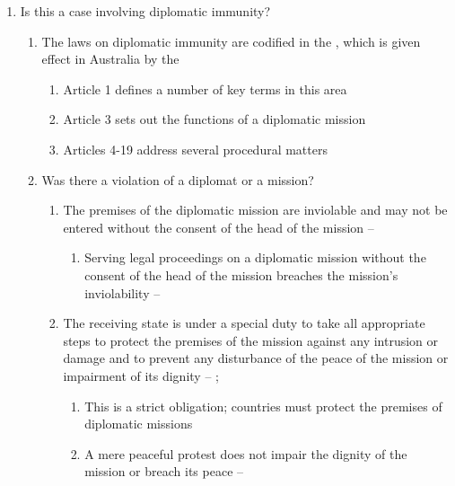 \begin{enumerate}
    \item Is this a case involving diplomatic immunity?
    \begin{enumerate}
        \item The laws on diplomatic immunity are codified in the , which is given effect in Australia by the 
        \begin{enumerate}
            \item Article 1 defines a number of key terms in this area
            \item Article 3 sets out the functions of a diplomatic mission
            \item Articles 4-19 address several procedural matters
        \end{enumerate}
        \item Was there a violation of a diplomat or a mission?
        \begin{enumerate}
            \item The premises of the diplomatic mission are inviolable and may not be entered without the consent of the head of the mission -- 
            \begin{enumerate}
                \item Serving legal proceedings on a diplomatic mission without the consent of the head of the mission breaches the mission's inviolability -- 
            \end{enumerate}
            \item The receiving state is under a special duty to take all appropriate steps to protect the premises of the mission against any intrusion or damage and to prevent any disturbance of the peace of the mission or impairment of its dignity -- ; 
            \begin{enumerate}
                \item This is a strict obligation; countries must protect the premises of diplomatic missions
                \item A mere peaceful protest does not impair the dignity of the mission or breach its peace -- 

\end{enumerate}
\end{enumerate}
\end{enumerate}
\end{enumerate}
